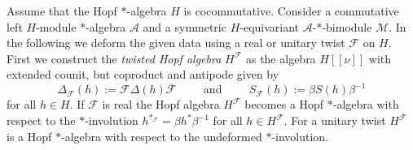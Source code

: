 \documentclass[a4paper,11pt]{article}
\begin{document}
Assume that the Hopf $*$-algebra $H$ is cocommutative. Consider a commutative
left $H$-module $*$-algebra $\mathcal{A}$ and a 
symmetric $H$-equivariant $\mathcal{A}$-$*$-bimodule $\mathcal{M}$. In the following
we deform the given data using a real or unitary twist $\mathcal{F}$ on $H$.
First we construct the \textit{twisted Hopf algebra} $H^\mathcal{F}$ as the algebra
$H[[\nu]]$ with extended counit, but coproduct and antipode given by
\begin{equation}
    \Delta_\mathcal{F}(h):=\mathcal{F}\Delta(h)\overline{\mathcal{F}}\hspace{1cm}
    \text{and}\hspace{1cm}
    S_\mathcal{F}(h):=\beta S(h)\beta^{-1}
\end{equation}
for all $h\in H$. If $\mathcal{F}$ is real the Hopf algebra $H^\mathcal{F}$ becomes a
Hopf $*$-algebra with respect to the $*$-involution 
$h^{*_\mathcal{F}}=\beta h^*\beta^{-1}$ for all $h\in H^\mathcal{F}$. For a unitary
twist $H^\mathcal{F}$ is a Hopf $*$-algebra with respect to the undeformed $*$-involution.
\end{document}
